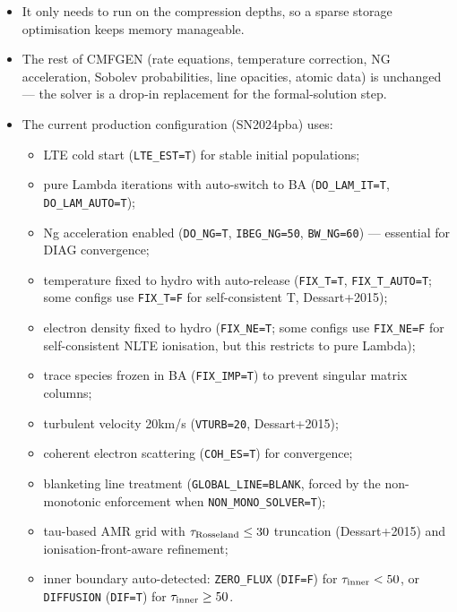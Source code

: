 \documentclass[11pt]{article}
\begin{document}
\begin{itemize}[nosep]
\begin{enumerate}[nosep]
            depth-independent solve avoids the singular cross-depth
            coupling that TRIDIAG produces when non-monotonic Eddington
            factors meet clamped-$\sigma$ moment equations;
      \item guarding against NaNs and negative intensities at five
            points in the propagation chain.
    \end{enumerate}
  \item It only needs to run on the compression depths, so a sparse
        storage optimisation keeps memory manageable.
  \item The rest of CMFGEN (rate equations, temperature correction, NG
        acceleration, Sobolev probabilities, line opacities, atomic
        data) is unchanged --- the solver is a drop-in replacement for
        the formal-solution step.
  \item The current production configuration (SN2024pba) uses:
    \begin{itemize}[nosep]
      \item LTE cold start (\texttt{LTE\_EST=T}) for stable initial
            populations;
      \item pure Lambda iterations with auto-switch to BA
            (\texttt{DO\_LAM\_IT=T}, \texttt{DO\_LAM\_AUTO=T});
      \item Ng acceleration enabled (\texttt{DO\_NG=T},
            \texttt{IBEG\_NG=50}, \texttt{BW\_NG=60}) --- essential for
            DIAG convergence;
      \item temperature fixed to hydro with auto-release
            (\texttt{FIX\_T=T}, \texttt{FIX\_T\_AUTO=T}; some configs
            use \texttt{FIX\_T=F} for self-consistent T, Dessart+2015);
      \item electron density fixed to hydro (\texttt{FIX\_NE=T};
            some configs use \texttt{FIX\_NE=F} for self-consistent
            NLTE ionisation, but this restricts to pure Lambda);
      \item trace species frozen in BA (\texttt{FIX\_IMP=T}) to prevent
            singular matrix columns;
      \item turbulent velocity 20\;km/s (\texttt{VTURB=20},
            Dessart+2015);
      \item coherent electron scattering (\texttt{COH\_ES=T}) for
            convergence;
      \item blanketing line treatment (\texttt{GLOBAL\_LINE=BLANK},
            forced by the non-monotonic enforcement when
            \texttt{NON\_MONO\_SOLVER=T});
      \item tau-based AMR grid with $\tau_{\rm Rosseland} \le 30$
            truncation (Dessart+2015) and ionisation-front-aware
            refinement;
      \item inner boundary auto-detected: \texttt{ZERO\_FLUX}
            (\texttt{DIF=F}) for $\tau_{\rm inner} < 50$, or
            \texttt{DIFFUSION} (\texttt{DIF=T}) for
            $\tau_{\rm inner} \ge 50$.
    \end{itemize}
\end{itemize}
\end{document}
